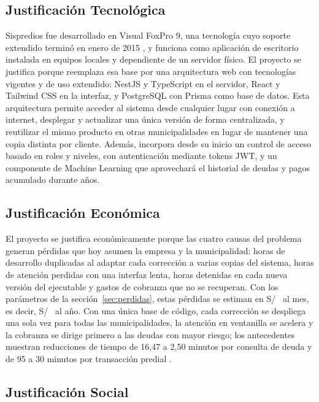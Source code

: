 \documentclass[12pt,a4paper]{report}
\newcommand{\soles}[1]{\edef\tmpval{\fpeval{round(#1,2)}}S/~\pgfmathprintnumber{\tmpval}}
\begin{document}
\subsection{Justificación Tecnológica}

Sispredios fue desarrollado en Visual FoxPro 9, una tecnología cuyo soporte extendido terminó en enero de 2015 \parencite{taft2007}, y funciona como aplicación de escritorio instalada en equipos locales y dependiente de un servidor físico. El proyecto se justifica porque reemplaza esa base por una arquitectura web con tecnologías vigentes y de uso extendido: NestJS y TypeScript en el servidor, React y Tailwind CSS en la interfaz, y PostgreSQL con Prisma como base de datos. Esta arquitectura permite acceder al sistema desde cualquier lugar con conexión a internet, desplegar y actualizar una única versión de forma centralizada, y reutilizar el mismo producto en otras municipalidades en lugar de mantener una copia distinta por cliente. Además, incorpora desde su inicio un control de acceso basado en roles y niveles, con autenticación mediante tokens JWT, y un componente de Machine Learning que aprovechará el historial de deudas y pagos acumulado durante años.

\subsection{Justificación Económica}
\label{sec:just-econ}

El proyecto se justifica económicamente porque las cuatro causas del problema generan pérdidas que hoy asumen la empresa y la municipalidad: horas de desarrollo duplicadas al adaptar cada corrección a varias copias del sistema, horas de atención perdidas con una interfaz lenta, horas detenidas en cada nueva versión del ejecutable y gastos de cobranza que no se recuperan. Con los parámetros de la sección~\ref{sec:perdidas}, estas pérdidas se estiman en \soles{\PerdMes} al mes, es decir, \soles{\PerdAnio} al año. Con una única base de código, cada corrección se despliega una sola vez para todas las municipalidades, la atención en ventanilla se acelera y la cobranza se dirige primero a las deudas con mayor riesgo; los antecedentes muestran reducciones de tiempo de 16,47 a 2,50 minutos por consulta de deuda \parencite{laulate2025} y de 95 a 30 minutos por transacción predial \parencite{omorog2022}.

\subsection{Justificación Social}
\end{document}
